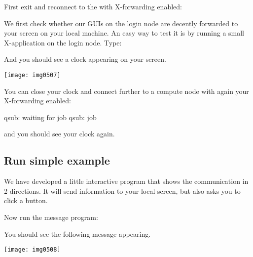 First exit and reconnect to the \hpc with X-forwarding enabled:

\begin{prompt}
\end{prompt}

We first check whether our GUIs on the login node are decently forwarded to
your screen on your local machine. An easy way to test it is by running a small
X-application on the login node. Type:

\begin{prompt}
\end{prompt}

And you should see a clock appearing on your screen.

\begin{center}
\texttt{[image: img0507]}
\end{center}

You can close your clock and connect further to a compute node with again your
X-forwarding enabled:

\begin{prompt}
qsub: waiting for job %
qsub: job %
\end{prompt}

and you should see your clock again.
\fi

\subsection{Run simple example}

We have developed a little interactive program that shows the communication in
2 directions. It will send information to your local screen, but also asks you
to click a button.

Now run the message program:
\begin{prompt}
\end{prompt}

You should see the following message appearing.

\begin{center}
\texttt{[image: img0508]}
\end{center}

